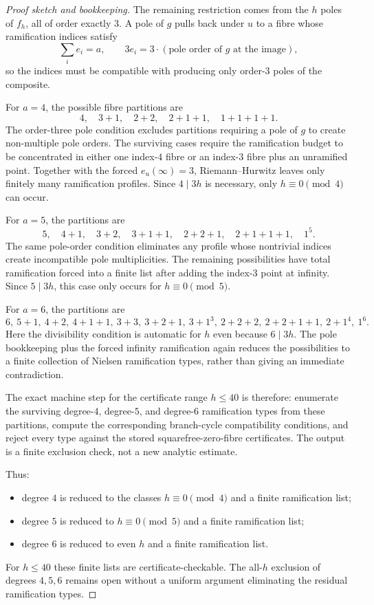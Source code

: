 \begin{proof}[Proof sketch and bookkeeping]
The remaining restriction comes from the $h$ poles of $f_h$, all of order exactly $3$. A pole of $g$ pulls back under $u$ to a fibre whose ramification indices satisfy
\[
\sum_i e_i=a,\qquad 3e_i=3\cdot(\text{pole order of }g\text{ at the image}),
\]
so the indices must be compatible with producing only order-$3$ poles of the composite.

For $a=4$, the possible fibre partitions are
\[
4,\quad 3+1,\quad 2+2,\quad 2+1+1,\quad 1+1+1+1.
\]
The order-three pole condition excludes partitions requiring a pole of $g$ to create non-multiple pole orders. The surviving cases require the ramification budget to be concentrated in either one index-$4$ fibre or an index-$3$ fibre plus an unramified point. Together with the forced $e_u(\infty)=3$, Riemann--Hurwitz leaves only finitely many ramification profiles. Since $4\mid 3h$ is necessary, only $h\equiv0\pmod4$ can occur.

For $a=5$, the partitions are
\[
5,\quad 4+1,\quad 3+2,\quad 3+1+1,\quad 2+2+1,\quad 2+1+1+1,\quad 1^5.
\]
The same pole-order condition eliminates any profile whose nontrivial indices create incompatible pole multiplicities. The remaining possibilities have total ramification forced into a finite list after adding the index-$3$ point at infinity. Since $5\mid3h$, this case only occurs for $h\equiv0\pmod5$.

For $a=6$, the partitions are
\[
6,\ 5+1,\ 4+2,\ 4+1+1,\ 3+3,\ 3+2+1,\ 3+1^3,\ 2+2+2,\ 2+2+1+1,\ 2+1^4,\ 1^6.
\]
Here the divisibility condition is automatic for $h$ even because $6\mid3h$. The pole bookkeeping plus the forced infinity ramification again reduces the possibilities to a finite collection of Nielsen ramification types, rather than giving an immediate contradiction.

The exact machine step for the certificate range $h\le40$ is therefore: enumerate the surviving degree-$4$, degree-$5$, and degree-$6$ ramification types from these partitions, compute the corresponding branch-cycle compatibility conditions, and reject every type against the stored squarefree-zero-fibre certificates. The output is a finite exclusion check, not a new analytic estimate.

Thus:
\begin{itemize}
\item degree $4$ is reduced to the classes $h\equiv0\pmod4$ and a finite ramification list;
\item degree $5$ is reduced to $h\equiv0\pmod5$ and a finite ramification list;
\item degree $6$ is reduced to even $h$ and a finite ramification list.
\end{itemize}
For $h\le40$ these finite lists are certificate-checkable. The all-$h$ exclusion of degrees $4,5,6$ remains open without a uniform argument eliminating the residual ramification types.
\end{proof}

